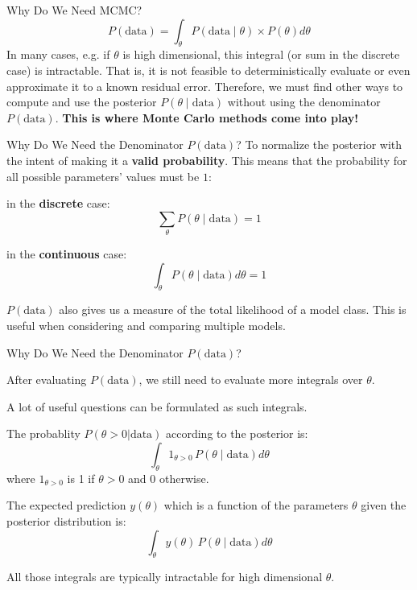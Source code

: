\begin{frame}{Why Do We Need MCMC?}
	$$
		P(\text{data})=\int_{\theta} P(\text{data} \mid \theta) \times P(\theta)d \theta
	$$
	In many cases, e.g. if $\theta$ is high dimensional, this integral (or sum in the discrete case) is intractable.
	That is, it is not feasible to deterministically evaluate or even approximate it to a known residual error.
	Therefore, we must find other ways to compute and use the posterior
	$P(\theta \mid \text{data})$ without using the denominator
	$P(\text{data})$.
	\vfill
	\Large \textbf{This is where Monte Carlo methods come into play!}
\end{frame}

\begin{frame}{Why Do We Need the Denominator $P(\text{data})$?}
	To normalize the posterior with the intent of making it a \textbf{valid probability}.
	This means that the probability for all possible parameters' values must be $1$:
	\begin{vfilleditems}
		\item in the \textbf{discrete} case:
		$$
			\sum_{\theta} P(\theta \mid \text{data}) = 1
		$$
		\item in the \textbf{continuous} case:
		$$
			\int_{\theta} P(\theta \mid \text{data})d \theta = 1
		$$
	\end{vfilleditems}
	$P(\text{data})$ also gives us a measure of the total likelihood of a model class. This is useful when considering and comparing multiple models.
\end{frame}

\begin{frame}{Why Do We Need the Denominator $P(\text{data})$?}
	\begin{vfilleditems}
		\item After evaluating $P(\text{data})$, we still need to evaluate more integrals over $\theta$.
		\item A lot of useful questions can be formulated as such integrals.
		\item The probablity $P(\theta > 0 | \text{data})$ according to the posterior is:
		$$
			\int_{\theta} 1_{\theta > 0} \, P(\theta \mid \text{data}) d\theta
		$$
		where $1_{\theta > 0}$ is 1 if $\theta > 0$ and 0 otherwise.
		\item The expected prediction $y(\theta)$ which is a function of the parameters $\theta$ given the posterior distribution is:
		$$
			\int_{\theta} y(\theta) \, P(\theta \mid \text{data}) d\theta
		$$
		\item All those integrals are typically intractable for high dimensional $\theta$.
	\end{vfilleditems}
\end{frame}

